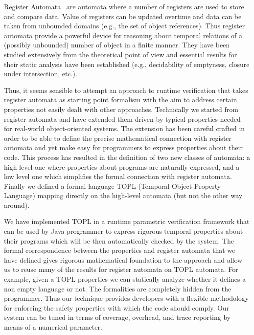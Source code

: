 \documentclass[9pt, preprint]{sigplanconf} %
\theoremstyle{definition}
\theoremstyle{remark}
\begin{document}
Register Automata~\cite{xxxx} are automata where a number of registers are used to store and compare data. Value of registers can be updated overtime and  data can be taken from unbounded domains (e.g., the set of object references). Thus register automata provide a powerful device for reasoning about temporal 
relations of a (possibly unbounded) number of object in a finite manner. They have been studied extensively from the theoretical point of
view and essential results for their static analysis have been established (e.g., decidability of emptyness, closure under intersection, etc.).

Thus, it seems sensible to attempt an approach to runtime verification that takes register automata as starting point formalism with the aim
to address certain properties not easily dealt with other approaches.
Technically we started from register automata and have extended them driven by typical properties needed for real-world object-oriented systems.
The extension has been careful crafted in order to be able to define the precise mathematical connection with register automata and yet
make easy for programmers to express properties about their code. This process has resulted in the definition of two new classes of 
automata: a high-level one where properties about programs are naturally expressed, and a low level one which simplifies the formal connection with  register automata. 
Finally we defined a formal language TOPL (Temporal Object Property Language) mapping directly on the 
high-level automata (but not the other way around). 

We have implemented TOPL  in a runtime parametric verification framework that can be used by Java programmer to express rigorous temporal 
properties about their programs which will be then automatically checked by the system.
The formal correspondence between the properties and register automata that we have defined gives rigorous mathematical foundation to
the approach and allow us to reuse many of the results for register automata on TOPL automata. For example, given a TOPL properties we can statically analyze whether it defines a non empty language or not.  The formalities are completely hidden from 
the programmer.  Thus our technique provides developers with a flexible methodology for enforcing the safety properties with which the code should comply. 
Our system can be tuned  in terms of coverage,  overhead, and trace reporting by means of a numerical parameter. 
\end{document}
